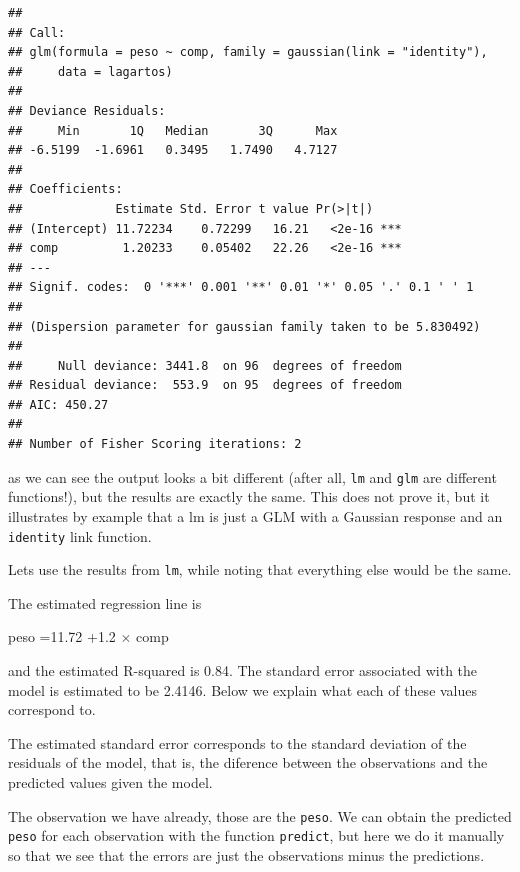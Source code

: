 \documentclass[
]{book}
\newenvironment{Shaded}{\begin{snugshade}}{\end{snugshade}}
\newcommand{\CommentTok}[1]{\textcolor[rgb]{0.56,0.35,0.01}{\textit{#1}}}
\newcommand{\DecValTok}[1]{\textcolor[rgb]{0.00,0.00,0.81}{#1}}
\newcommand{\KeywordTok}[1]{\textcolor[rgb]{0.13,0.29,0.53}{\textbf{#1}}}
\newcommand{\NormalTok}[1]{#1}
\newcommand{\OperatorTok}[1]{\textcolor[rgb]{0.81,0.36,0.00}{\textbf{#1}}}
\begin{document}
\begin{verbatim}
## 
## Call:
## glm(formula = peso ~ comp, family = gaussian(link = "identity"), 
##     data = lagartos)
## 
## Deviance Residuals: 
##     Min       1Q   Median       3Q      Max  
## -6.5199  -1.6961   0.3495   1.7490   4.7127  
## 
## Coefficients:
##             Estimate Std. Error t value Pr(>|t|)    
## (Intercept) 11.72234    0.72299   16.21   <2e-16 ***
## comp         1.20233    0.05402   22.26   <2e-16 ***
## ---
## Signif. codes:  0 '***' 0.001 '**' 0.01 '*' 0.05 '.' 0.1 ' ' 1
## 
## (Dispersion parameter for gaussian family taken to be 5.830492)
## 
##     Null deviance: 3441.8  on 96  degrees of freedom
## Residual deviance:  553.9  on 95  degrees of freedom
## AIC: 450.27
## 
## Number of Fisher Scoring iterations: 2
\end{verbatim}

as we can see the output looks a bit different (after all, \texttt{lm} and \texttt{glm} are different functions!), but the results are exactly the same. This does not prove it, but it illustrates by example that a lm is just a GLM with a Gaussian response and an \texttt{identity} link function.

Lets use the results from \texttt{lm}, while noting that everything else would be the same.

The estimated regression line is

peso =11.72 +1.2 \(\times\) comp

and the estimated R-squared is 0.84. The standard error associated with the model is estimated to be 2.4146. Below we explain what each of these values correspond to.

The estimated standard error corresponds to the standard deviation of the residuals of the model, that is, the diference between the observations and the predicted values given the model.

The observation we have already, those are the \texttt{peso}. We can obtain the predicted \texttt{peso} for each observation with the function \texttt{predict}, but here we do it manually so that we see that the errors are just the observations minus the predictions.

\begin{Shaded}
\end{Shaded}
\end{document}
